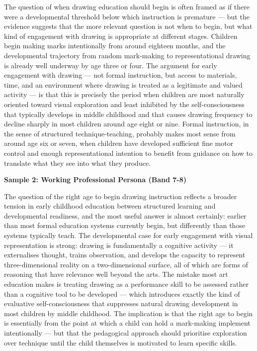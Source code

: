 The question of when drawing education should begin is often framed as if there were a developmental threshold below which instruction is premature — but the evidence suggests that the more relevant question is not when to begin, but what kind of engagement with drawing is appropriate at different stages. Children begin making marks intentionally from around eighteen months, and the developmental trajectory from random mark-making to representational drawing is already well underway by age three or four. The argument for early engagement with drawing — not formal instruction, but access to materials, time, and an environment where drawing is treated as a legitimate and valued activity — is that this is precisely the period when children are most naturally oriented toward visual exploration and least inhibited by the self-consciousness that typically develops in middle childhood and that causes drawing frequency to decline sharply in most children around age eight or nine. Formal instruction, in the sense of structured technique-teaching, probably makes most sense from around age six or seven, when children have developed sufficient fine motor control and enough representational intention to benefit from guidance on how to translate what they see into what they produce.

\textbf{Sample 2: Working Professional Persona (Band 7-8)}

The question of the right age to begin drawing instruction reflects a broader tension in early childhood education between structured learning and developmental readiness, and the most useful answer is almost certainly: earlier than most formal education systems currently begin, but differently than those systems typically teach. The developmental case for early engagement with visual representation is strong: drawing is fundamentally a cognitive activity — it externalises thought, trains observation, and develops the capacity to represent three-dimensional reality on a two-dimensional surface, all of which are forms of reasoning that have relevance well beyond the arts. The mistake most art education makes is treating drawing as a performance skill to be assessed rather than a cognitive tool to be developed — which introduces exactly the kind of evaluative self-consciousness that suppresses natural drawing development in most children by middle childhood. The implication is that the right age to begin is essentially from the point at which a child can hold a mark-making implement intentionally — but that the pedagogical approach should prioritise exploration over technique until the child themselves is motivated to learn specific skills.

